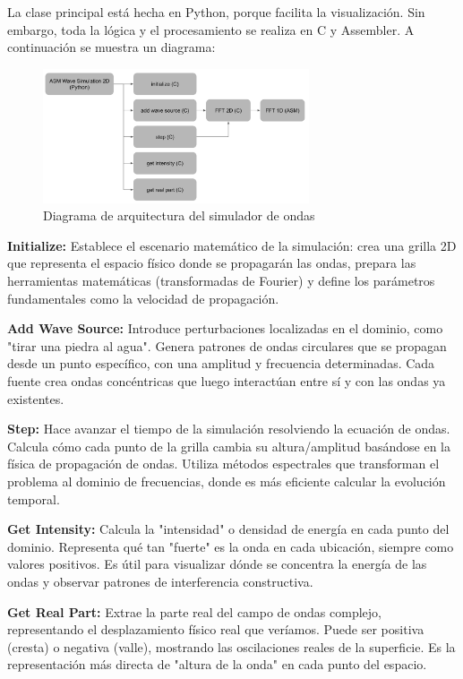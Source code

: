 \documentclass[a4paper]{article}
\begin{document}
La clase principal está hecha en Python, porque facilita la visualización. Sin embargo, toda la lógica y el procesamiento se realiza en C y Assembler. A continuación se muestra un diagrama:

\begin{figure}[h]
    \centering
    \includegraphics[width=0.7\textwidth]{extra/diagram.png}
    \caption{Diagrama de arquitectura del simulador de ondas}
    \label{fig:wave_sim_architecture}
\end{figure}

\textbf{Initialize:} Establece el escenario matemático de la simulación: crea una grilla 2D que representa el espacio físico donde se propagarán las ondas, prepara las herramientas matemáticas (transformadas de Fourier) y define los parámetros fundamentales como la velocidad de propagación.

\textbf{Add Wave Source:} Introduce perturbaciones localizadas en el dominio, como "tirar una piedra al agua". Genera patrones de ondas circulares que se propagan desde un punto específico, con una amplitud y frecuencia determinadas. Cada fuente crea ondas concéntricas que luego interactúan entre sí y con las ondas ya existentes.

\textbf{Step:} Hace avanzar el tiempo de la simulación resolviendo la ecuación de ondas. Calcula cómo cada punto de la grilla cambia su altura/amplitud basándose en la física de propagación de ondas. Utiliza métodos espectrales que transforman el problema al dominio de frecuencias, donde es más eficiente calcular la evolución temporal.

\textbf{Get Intensity:} Calcula la "intensidad" o densidad de energía en cada punto del dominio. Representa qué tan "fuerte" es la onda en cada ubicación, siempre como valores positivos. Es útil para visualizar dónde se concentra la energía de las ondas y observar patrones de interferencia constructiva.

\textbf{Get Real Part:} Extrae la parte real del campo de ondas complejo, representando el desplazamiento físico real que veríamos. Puede ser positiva (cresta) o negativa (valle), mostrando las oscilaciones reales de la superficie. Es la representación más directa de "altura de la onda" en cada punto del espacio.
\end{document}
